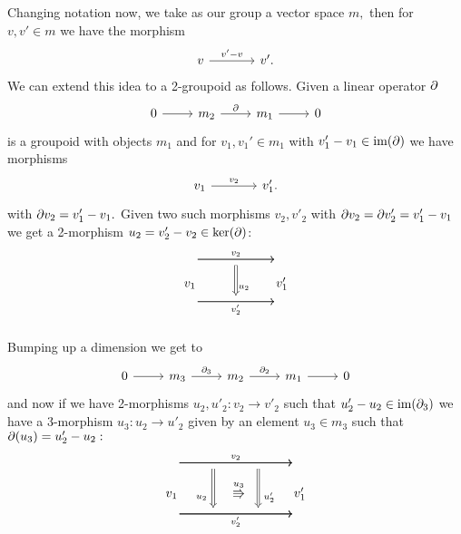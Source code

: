 \documentclass[12pt]{article}
\begin{document}
Changing notation now, we take as our group a vector space $m,$
then for $v,v'\in m$ we have the morphism
\[\begin{tikzcd}[column sep = large]
v \arrow{r}{v'-v} & v'. \end{tikzcd} \]
We can extend this idea to a 2-groupoid as follows.
Given a linear operator $\partial$
\[\begin{tikzcd} 0 \arrow{r} & m_2 \arrow{r}{\bdy} & m_1 \arrow{r} & 0 \end{tikzcd} \]
is a groupoid with objects $m_1$ and
for $v_1, v_1'\in m_1$ with $v_1'-v_1 \in \mbox{im}(\partial)$
we have morphisms
\[\begin{tikzcd}[column sep = large]
v_1 \arrow{r}{v_2} & v_1'. \end{tikzcd} \]
with $\partial v_2=v_1'-v_1.$
Given two such morphisms $v_2, v'_2$ with $\partial v_2=\partial v_2'=v_1'-v_1$ 
we get a 2-morphism $u_2=v_2'-v_2\in\mbox{ker}(\partial)$:
$$
\begin{tikzcd}[column sep = small, row sep = tiny]
\ \arrow{rr}[]{v_2} \arrow{rr}[name=U,below]{} & \ & \   \\
v_1         & \ \ \ \ {}_{u_2}              & v_1' \\
\ \arrow{rr}[below]{v_2'} \arrow{rr}[name=D]{}  &  \     & \   \\
\arrow[Rightarrow,to path=(U) -- (D),left]{}
\end{tikzcd}
$$

Bumping up a dimension we get to
\[\begin{tikzcd} 0 \arrow{r} & m_3 \arrow{r}{\bdy_3} & m_2 \arrow{r}{\bdy_2} & m_1 \arrow{r} & 0 \end{tikzcd} \]
and now if we have 2-morphisms $u_2, u'_2: v_2 \to v'_2 $
such that $u'_2-u_2\in \mbox{im}(\partial_3)$
we have a 3-morphism $u_3:u_2\to u'_2$ 
given by an element $u_3\in m_3$ such that $\partial(u_3)=u'_2-u_2:$
$$
\begin{tikzcd}[column sep = tiny, row sep = tiny]
\ \arrow{rrr}[]{v_2} \arrow{rrr}[pos=0.3,name=U,below]{} \arrow{rrr}[pos=0.7,name=UU,below]{} & \ & \ &\  \\
v_1         & {}_{u_2} \ \ \ \ \ \overset{u_3}{\Rrightarrow} & {}_{u'_2}    & v_1' \\
\ \arrow{rrr}[below]{v_2'} \arrow{rrr}[pos=0.3,name=D]{} \arrow{rrr}[pos=0.7,name=DD]{}   &  \   &\  & \   \\
\arrow[Rightarrow,to path=(U) -- (D),left]{}
\arrow[Rightarrow,to path=(UU) -- (DD),left]{}
\end{tikzcd}
$$
\end{document}
